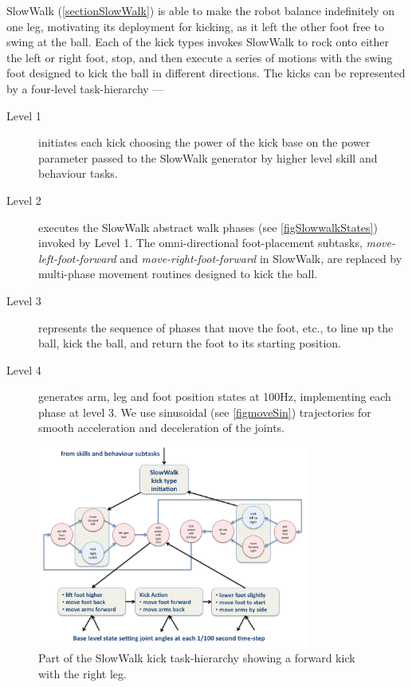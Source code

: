 \documentclass[pdftex,11pt,a4paper]{report}
\begin{document}
SlowWalk (\autoref{sectionSlowWalk}) is able to make the robot balance indefinitely on one leg, motivating its deployment for kicking, as it left the other  foot free to swing at the ball. Each of the kick types invokes SlowWalk to rock onto either the left or right foot, stop, and then execute a series of motions with the swing foot designed to kick the ball in different directions. The kicks can be represented by a four-level task-hierarchy --- 
\begin{description}
\item[Level 1] initiates each kick choosing the power of the kick base on the power parameter passed to the SlowWalk generator by higher level skill and behaviour tasks.
\item [Level 2] executes the SlowWalk abstract walk phases (see \autoref{figSlowwalkStates}) invoked by Level 1. The omni-directional foot-placement subtasks, \emph{move-left-foot-forward} and \emph{move-right-foot-forward} in SlowWalk, are replaced by multi-phase movement routines designed to kick the ball. 
\item [Level 3] represents the sequence of phases that move the foot, etc., to line up the ball, kick the ball, and return the foot to its starting position.
\item [Level 4]  generates arm, leg and foot position states at 100Hz, implementing each phase at level 3. We use sinusoidal (see \autoref{figmoveSin}) trajectories for smooth acceleration and deceleration of the joints.   
\end{description}

\begin{figure}[ht]
\centering
\includegraphics[width=0.8\textwidth]{figures/SlowWalkKickTaskHierarchy}
\caption{Part of the SlowWalk kick task-hierarchy showing a forward kick with the right leg.} \label{figSlowWalkKickTaskHierarchy}
\end{figure} 
\end{document}
